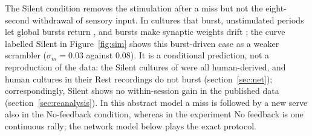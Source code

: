 \documentclass[12pt]{article}
\numberwithin{equation}{section}
\begin{document}
The Silent condition removes the stimulation after a miss but not the eight-second withdrawal of sensory input. In cultures that burst, unstimulated periods let global bursts return \citep{Wagenaar2005}, and bursts make synaptic weights drift \citep{Chao2005}; the curve labelled Silent in Figure~\ref{fig:sim} shows this burst-driven case as a weaker scrambler ($\sigma_m=0.03$ against $0.08$). It is a conditional prediction, not a reproduction of the data: the Silent cultures of \citet{Kagan2022} were all human-derived, and human cultures in their Rest recordings do not burst (section~\ref{sec:net}); correspondingly, Silent shows no within-session gain in the published data (section~\ref{sec:reanalysis}). In this abstract model a miss is followed by a new serve also in the No-feedback condition, whereas in the experiment No feedback is one continuous rally; the network model below plays the exact protocol.
\end{document}
